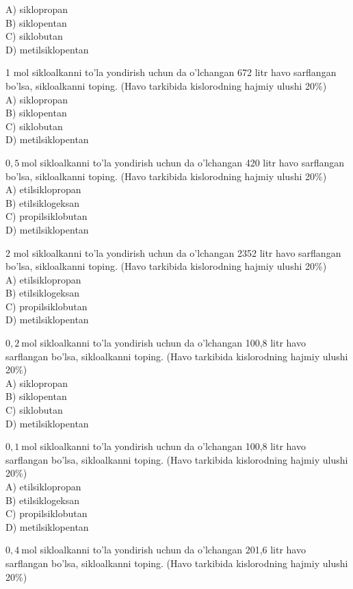 A) siklopropan\\
B) siklopentan\\
C) siklobutan\\
D) metilsiklopentan
  \item 1 mol sikloalkanni to'la yondirish uchun da o'lchangan 672 litr havo sarflangan bo'lsa, sikloalkanni toping. (Havo tarkibida kislorodning hajmiy ulushi 20\%)\\
A) siklopropan\\
B) siklopentan\\
C) siklobutan\\
D) metilsiklopentan
  \item $0,5 \mathrm{~mol}$ sikloalkanni to'la yondirish uchun da o'lchangan 420 litr havo sarflangan bo'lsa, sikloalkanni toping. (Havo tarkibida kislorodning hajmiy ulushi 20\%)\\
A) etilsiklopropan\\
B) etilsiklogeksan\\
C) propilsiklobutan\\
D) metilsiklopentan
  \item 2 mol sikloalkanni to'la yondirish uchun da o'lchangan 2352 litr havo sarflangan bo'lsa, sikloalkanni toping. (Havo tarkibida kislorodning hajmiy ulushi 20\%)\\
A) etilsiklopropan\\
B) etilsiklogeksan\\
C) propilsiklobutan\\
D) metilsiklopentan
  \item $0,2 \mathrm{~mol}$ sikloalkanni to'la yondirish uchun da o'lchangan 100,8 litr havo sarflangan bo'lsa, sikloalkanni toping. (Havo tarkibida kislorodning hajmiy ulushi 20\%)\\
A) siklopropan\\
B) siklopentan\\
C) siklobutan\\
D) metilsiklopentan
  \item $0,1 \mathrm{~mol}$ sikloalkanni to'la yondirish uchun da o'lchangan 100,8 litr havo sarflangan bo'lsa, sikloalkanni toping. (Havo tarkibida kislorodning hajmiy ulushi 20\%)\\
A) etilsiklopropan\\
B) etilsiklogeksan\\
C) propilsiklobutan\\
D) metilsiklopentan
  \item $0,4 \mathrm{~mol}$ sikloalkanni to'la yondirish uchun da o'lchangan 201,6 litr havo sarflangan bo'lsa, sikloalkanni toping. (Havo tarkibida kislorodning hajmiy ulushi 20\%)\\
